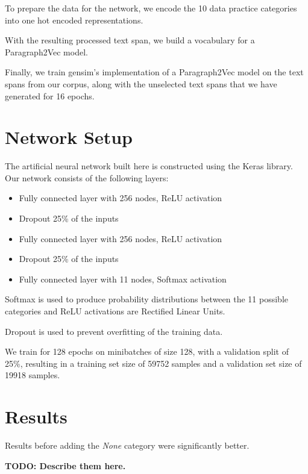 \documentclass[12pt, letterpaper]{article}
\begin{document}
\hline
To prepare the data for the network, we encode the 10 data practice categories into one hot encoded representations.  

 With the resulting processed text span, we build a vocabulary for a Paragraph2Vec model.

Finally, we train gensim's implementation of a Paragraph2Vec model on the text spans from our corpus, along with the unselected text spans that we have generated for 16 epochs.


\section{Network Setup}
The artificial neural network built here is constructed using the Keras library. Our network consists of the following layers:

\begin{itemize}
\item Fully connected layer with 256 nodes, ReLU activation
\item Dropout 25\% of the inputs
\item Fully connected layer with 256 nodes, ReLU activation
\item Dropout 25\% of the inputs
\item Fully connected layer with 11 nodes, Softmax activation
\end{itemize}

Softmax is used to produce probability distributions between the 11 possible categories and ReLU activations are Rectified Linear Units. 

Dropout is used to prevent overfitting of the training data.

We train for 128 epochs on minibatches of size 128, with a validation split of 25\%, resulting in a training set size of 59752 samples and a validation set size of 19918 samples.

\section{Results}
Results before adding the \textit{None} category were significantly better. 

\textbf{TODO: Describe them here.}
\end{document}
